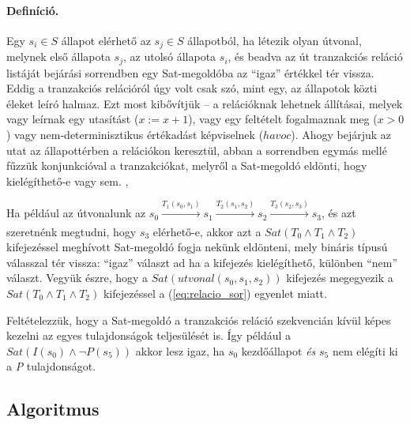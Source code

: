 \paragraph{Definíció.}
Egy $s_i \in S$ állapot elérhető az $s_j \in S$ állapotból, ha létezik olyan útvonal, melynek első állapota $s_j$, az utolsó állapota $s_i$, és beadva az út tranzakciós reláció listáját bejárási sorrendben egy Sat-megoldóba az ``igaz'' értékkel tér vissza.
\newline
\newline
Eddig a tranzakciós relációról úgy volt csak szó, mint egy, az állapotok közti éleket leíró halmaz. Ezt most kibővítjük -- a relációknak lehetnek állításai, melyek vagy leírnak egy utasítást ($x := x + 1$), vagy egy feltételt fogalmaznak meg ($x > 0$) vagy nem-determinisztikus értékadást képviselnek ($\mathit{havoc}$). Ahogy bejárjuk az utat az állapottérben a relációkon keresztül, abban a sorrendben egymás mellé fűzzük konjunkcióval a tranzakciókat, melyről a Sat-megoldó eldönti, hogy kielégíthető-e vagy sem.
,
\begin{example}
	Ha például az útvonalunk az $s_0 \xrightarrow[\text{}]{\text{$T_1(s_0, s_1)$}} s_1 \xrightarrow[\text{}]{\text{$T_2(s_1, s_2)$}} s_2 \xrightarrow[\text{}]{\text{$T_3(s_2, s_3)$}} s_3$, és azt szeretnénk megtudni, hogy $s_3$ elérhető-e, akkor azt a $\mathit{Sat}(T_0 \wedge T_1 \wedge T_2)$ kifejezéssel meghívott Sat-megoldó fogja nekünk eldönteni, mely bináris típusú válasszal tér vissza: ``igaz'' választ ad ha a kifejezés kielégíthető, különben ``nem'' választ. Vegyük észre, hogy a $\mathit{Sat}(\mathit{utvonal}(s_0, s_1, s_2))$ kifejezés megegyezik a $\mathit{Sat}(T_0 \wedge T_1 \wedge T_2)$ kifejezéssel a (\ref{eq:relacio_sor}) egyenlet miatt.
\end{example}
Feltételezzük, hogy a Sat-megoldó a tranzakciós reláció szekvencián kívül képes kezelni az egyes tulajdonságok teljesülését is. Így például a $\mathit{Sat}(I(s_0) \wedge \neg P(s_5))$ akkor lesz igaz, ha $s_0$ kezdőállapot \emph{és} $s_5$ nem elégíti ki a \emph{P} tulajdonságot.

\subsection{Algoritmus}

